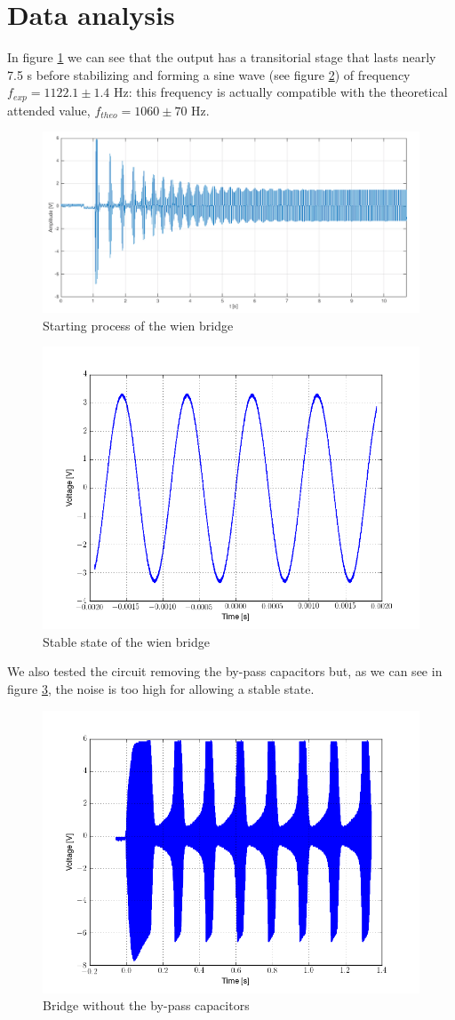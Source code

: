 \section{Data analysis}
In figure \ref{starting} we can see that the output has a transitorial stage that lasts nearly 7.5 s before stabilizing and forming a sine wave (see figure \ref{stable}) of frequency $f_{exp} = 1122.1 \pm 1.4$ Hz: this frequency is actually compatible with the theoretical attended value, $f_{theo} = 1060 \pm 70$ Hz.
\begin{figure}[H]
\centering
\includegraphics[width=.7\textwidth]{9/starting.png}
\caption{Starting process of the wien bridge}\label{starting}
\end{figure}
\begin{figure}[H]
\centering
\includegraphics[width=.7\textwidth]{9/stable.png}
\caption{Stable state of the wien bridge}\label{stable}
\end{figure}
We also tested the circuit removing the by-pass capacitors but, as we can see in figure \ref{without_bypass}, the noise is too high for allowing a stable state.
\begin{figure}[H]
\centering
\includegraphics[width=.7\textwidth]{9/without_bypass.png}
\caption{Bridge without the by-pass capacitors}\label{without_bypass}
\end{figure}
